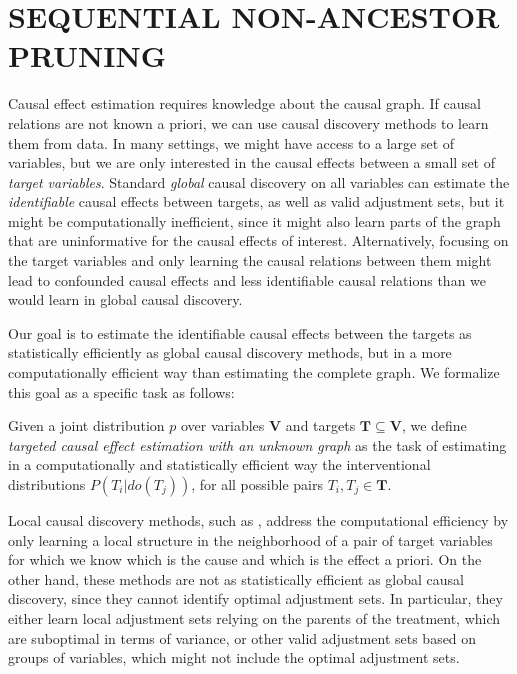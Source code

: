 \section{SEQUENTIAL NON-ANCESTOR PRUNING}
\label{sec:method}

Causal effect estimation requires knowledge about the causal graph.
If causal relations are not known a priori, we can use causal discovery methods to learn them from data.
In many settings, we might have access to a large set of variables, but we are only interested in the causal effects between a small set of \emph{target variables}. Standard \emph{global} causal discovery on all variables can estimate the \emph{identifiable} causal effects between targets, as well as valid adjustment sets, but it might be computationally inefficient, since it might also learn parts of the graph that are uninformative for the causal effects of interest. 
Alternatively, focusing on the target variables and only learning the causal relations between them might lead to confounded causal effects and less identifiable causal relations than we would learn in global causal discovery.

Our goal is to estimate the identifiable causal effects between the targets as statistically efficiently as global causal discovery methods, but in a more computationally efficient way than estimating the complete graph.
We formalize this goal as a specific task as follows:

\begin{definition}%
\label{def:task}
Given a joint distribution $p$ over variables $\mathbf{V}$ and targets $\mathbf{T} \subseteq \mathbf{V}$,  we define \emph{targeted causal effect estimation with an unknown graph} as the task of estimating in a computationally and statistically efficient way the interventional distributions $P(T_i|do(T_j))$, for all possible pairs $T_i,T_j \in \mathbf{T}$.
\end{definition}

Local causal discovery methods, such as \citep{wang2014discovering, gupta2023local,maasch2024local}, address the computational efficiency by only learning a local structure in the neighborhood of a pair of target variables for which we know which is the cause and which is the effect a priori.
On the other hand, these methods are  not as statistically efficient as global causal discovery, since they cannot identify optimal adjustment sets. In particular, they either learn local adjustment sets relying on the parents of the treatment, which are suboptimal in terms of variance, or other valid adjustment sets based on groups of variables, which might not include the optimal adjustment sets. 

